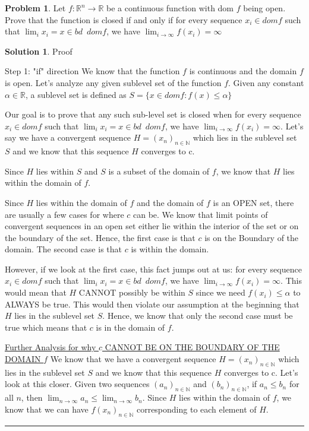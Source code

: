 \documentclass{article}
\theoremstyle{definition}
\newtheorem{problem}{Problem}
\def\fline{\rule{0.75\linewidth}{0.5pt}}
\newcommand{\finishline}{\begin{center}\fline\end{center}}
\newtheorem*{solution*}{Solution}
\newenvironment{solution}{\begin{solution*}}{{\finishline} \end{solution*}}
\begin{document}
\begin{problem}
Let $f : \mathbb{R}^n \rightarrow \mathbb{R}$ be a continuous function with dom $f$ being open. Prove that the function is closed if and only if for every sequence $x_i \in dom f$ such that $\lim_{i} x_i = x \in bd \enspace dom f$, we have $\lim_{i\to\infty} f(x_i) = \infty$

\begin{solution} Proof 

Step 1: "if" direction \newline 
We know that the function  $f$ is continuous and the domain $f$ is open. Let's analyze any given sublevel set of the function $f$. Given any constant $\alpha \in \mathbb{R}$, a sublevel set is defined as $S = \{x \in dom f : f(x) \leq \alpha \}$

Our goal is to prove that any such sub-level set is closed when for every sequence $x_i \in dom f$ such that $\lim_{i} x_i = x \in bd \enspace dom f$, we have $\lim_{i\to\infty} f(x_i) = \infty$. Let's say we have a convergent sequence $H = (x_n)_{n \in \mathbb{N}}$ which lies in the sublevel set $S$ and we know that this sequence $H$ converges to c. 

Since $H$ lies within $S$ and $S$ is a subset of the domain of $f$, we know that $H$ lies within the domain of $f$. 

Since $H$ lies within the domain of $f$ and the domain of $f$ is an OPEN set, there are usually a few cases for where $c$ can be. We know that limit points of convergent sequences in an open set either lie within the interior of the set or on the boundary of the set. Hence, the first case is that $c$ is on the Boundary of the domain. The second case is that $c$ is within the domain. 

However, if we look at the first case, this fact jumps out at us: for every sequence $x_i \in dom f$ such that $\lim_{i} x_i = x \in bd \enspace dom f$, we have $\lim_{i\to\infty} f(x_i) = \infty$. This would mean that $H$ CANNOT possibly be within $S$ since we need $f(x_i) \leq \alpha$ to ALWAYS be true. This would then violate our assumption at the beginning that $H$ lies in the sublevel set $S$. Hence, we know that only the second case must be true which means that $c$ is in the domain of $f$.   \newline 


\underline{Further Analysis for why $c$ CANNOT BE ON THE BOUNDARY OF THE DOMAIN $f$} \newline 
We know that we have a convergent sequence $H = (x_n)_{n \in \mathbb{N}}$ which lies in the sublevel set $S$ and we know that this sequence $H$ converges to c. 
Let's look at this closer. Given two sequences $(a_n)_{n \in \mathbb{N}}$ and $(b_n)_{n \in \mathbb{N}}$, if $a_n \leq b_n$ for all $n$, then  $\lim_{n\to\infty} a_n \leq \lim_{n\to\infty} b_n$. Since $H$ lies within the domain of $f$, we know that we can have $f(x_n)_{n \in \mathbb{N}}$ corresponding to each element of $H$. \newline 


\end{solution}
\end{problem}
\end{document}
